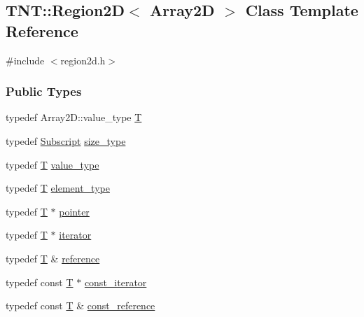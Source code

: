 \subsection{TNT::Region2D$<$ Array2D $>$ Class Template Reference}
\label{class_t_n_t_1_1_region2_d}


{\ttfamily \#include $<$region2d.h$>$}

\subsubsection*{Public Types}
\begin{DoxyCompactItemize}
\item 
typedef Array2D::value\_\-type \hyperlink{class_t_n_t_1_1_region2_d_a2780b0cebcd8d0601644c7b591b47c2d}{T}
\item 
typedef \hyperlink{namespace_t_n_t_af22e3f1460e145c04ce4e7d701e4c1c1}{Subscript} \hyperlink{class_t_n_t_1_1_region2_d_a595890ac97cbda26374abf36d2b24c22}{size\_\-type}
\item 
typedef \hyperlink{class_t_n_t_1_1_region2_d_a2780b0cebcd8d0601644c7b591b47c2d}{T} \hyperlink{class_t_n_t_1_1_region2_d_aa211fe1b8bae0e5ac22ac49b92049ba2}{value\_\-type}
\item 
typedef \hyperlink{class_t_n_t_1_1_region2_d_a2780b0cebcd8d0601644c7b591b47c2d}{T} \hyperlink{class_t_n_t_1_1_region2_d_a21bf96002e218ab5715737f052528658}{element\_\-type}
\item 
typedef \hyperlink{class_t_n_t_1_1_region2_d_a2780b0cebcd8d0601644c7b591b47c2d}{T} $\ast$ \hyperlink{class_t_n_t_1_1_region2_d_ab0a7a27e7e90e47ba12d57ae37d59d90}{pointer}
\item 
typedef \hyperlink{class_t_n_t_1_1_region2_d_a2780b0cebcd8d0601644c7b591b47c2d}{T} $\ast$ \hyperlink{class_t_n_t_1_1_region2_d_ab6fffab6d7607222f1bc7f840cb6e181}{iterator}
\item 
typedef \hyperlink{class_t_n_t_1_1_region2_d_a2780b0cebcd8d0601644c7b591b47c2d}{T} \& \hyperlink{class_t_n_t_1_1_region2_d_a9aac9872c214c5647a927ea20bd940bc}{reference}
\item 
typedef const \hyperlink{class_t_n_t_1_1_region2_d_a2780b0cebcd8d0601644c7b591b47c2d}{T} $\ast$ \hyperlink{class_t_n_t_1_1_region2_d_a97694d94a4cf5d7e51f58575f0779792}{const\_\-iterator}
\item 
typedef const \hyperlink{class_t_n_t_1_1_region2_d_a2780b0cebcd8d0601644c7b591b47c2d}{T} \& \hyperlink{class_t_n_t_1_1_region2_d_a89762bf682b0d388b72b821a3a48e6bc}{const\_\-reference}
\end{DoxyCompactItemize}
